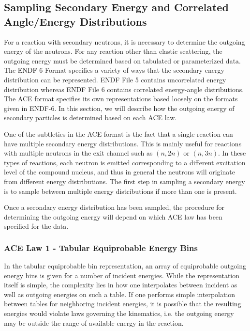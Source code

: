 \subsection{Sampling Secondary Energy and Correlated Angle/Energy Distributions}
\label{sec:sample-energy}

For a reaction with secondary neutrons, it is necessary to determine the
outgoing energy of the neutrons. For any reaction other than elastic scattering,
the outgoing energy must be determined based on tabulated or parameterized
data. The ENDF-6 Format \cite{bnl-herman-2009} specifies a variety of ways that
the secondary energy distribution can be represented. ENDF File 5 contains
uncorrelated energy distribution whereas ENDF File 6 contains correlated
energy-angle distributions. The ACE format specifies its own representations
based loosely on the formats given in ENDF-6. In this section, we will describe
how the outgoing energy of secondary particles is determined based on each ACE
law.

One of the subtleties in the ACE format is the fact that a single reaction can
have multiple secondary energy distributions. This is mainly useful for
reactions with multiple neutrons in the exit channel such as $(n,2n)$ or
$(n,3n)$. In these types of reactions, each neutron is emitted corresponding to
a different excitation level of the compound nucleus, and thus in general the
neutrons will originate from different energy distributions. The first step in
sampling a secondary energy is to sample between multiple energy distributions
if more than one is present.

Once a secondary energy distribution has been sampled, the procedure for
determining the outgoing energy will depend on which ACE law has been specified
for the data.

\subsubsection{ACE Law 1 - Tabular Equiprobable Energy Bins}
\label{sec:ace-law-1}

In the tabular equiprobable bin representation, an array of equiprobable
outgoing energy bins is given for a number of incident energies. While the
representation itself is simple, the complexity lies in how one interpolates
between incident as well as outgoing energies on such a table. If one performs
simple interpolation between tables for neighboring incident energies, it is
possible that the resulting energies would violate laws governing the
kinematics, i.e. the outgoing energy may be outside the range of available
energy in the reaction.

